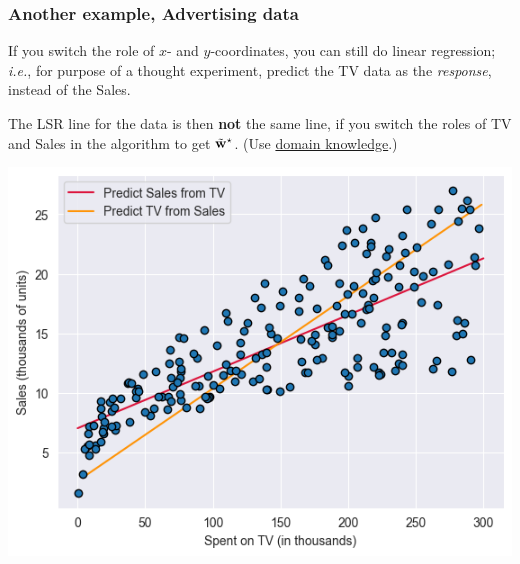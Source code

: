 \documentclass{beamer}
\theoremstyle{example}
\begin{document}
\begin{frame}[fragile]
\frametitle{Another example, Advertising data}
If you switch the role of $x$- and $y$-coordinates, you can still do linear regression; \textit{i.e.}, for purpose of a thought experiment, predict the TV data as the \emph{response}, instead of the Sales.

The LSR line for the data is then \textbf{not} the same line, if you switch the roles of TV and Sales in the algorithm to get $\tilde{\bf w}^\star$. (Use \underline{domain knowledge}.)

\centering
\includegraphics[height=0.4\textheight]{advertising-plot2.png}
\vfill

\end{frame}
\end{document}
